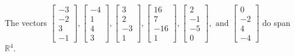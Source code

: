 \begin{exercise}
\begin{exerciseStatement}
  \end{exerciseStatement}
  \begin{exerciseAnswer}
   The vectors \(\left[\begin{array}{r}
-3 \\
-2 \\
3 \\
-1
\end{array}\right] , \left[\begin{array}{r}
-4 \\
1 \\
4 \\
3
\end{array}\right] , \left[\begin{array}{r}
3 \\
2 \\
-3 \\
1
\end{array}\right] , \left[\begin{array}{r}
16 \\
7 \\
-16 \\
1
\end{array}\right] , \left[\begin{array}{r}
2 \\
-1 \\
-5 \\
0
\end{array}\right] , \text{ and } \left[\begin{array}{r}
0 \\
-2 \\
4 \\
-4
\end{array}\right]\) 
  	 do  
	span \(\mathbb{R}^4\).
  


  \end{exerciseAnswer}
\end{exercise}